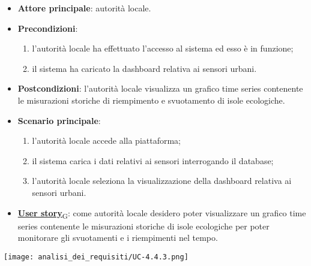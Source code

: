 \begin{itemize}
	\item \textbf{Attore principale}: autorità locale.
	\item \textbf{Precondizioni}:
	      \begin{enumerate}
		      \item l'autorità locale ha effettuato l'accesso al sistema ed esso è in funzione;
		      \item il sistema ha caricato la dashboard relativa ai sensori urbani.
	      \end{enumerate}
	\item \textbf{Postcondizioni}: l'autorità locale visualizza un grafico time series contenente le misurazioni storiche di riempimento e svuotamento
	      di isole ecologiche.
	\item \textbf{Scenario principale}:
	      \begin{enumerate}
		      \item l'autorità locale accede alla piattaforma;
		      \item il sistema carica i dati relativi ai sensori interrogando il database;
		      \item l'autorità locale seleziona la visualizzazione della dashboard relativa ai sensori urbani.
	      \end{enumerate}
	\item \href{https://7last.github.io/docs/pb/documentazione-interna/glossario\#user-story}{\textbf{User story}\textsubscript{G}}:
	      come autorità locale desidero poter visualizzare un grafico time series contenente le misurazioni storiche
	      di isole ecologiche per poter monitorare gli svuotamenti e i riempimenti nel tempo.
\end{itemize}
\begin{center}
	\texttt{[image: analisi\_dei\_requisiti/UC-4.4.3.png]}
\end{center}


